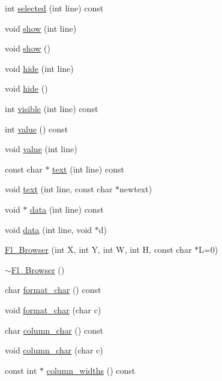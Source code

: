 \begin{DoxyCompactItemize}
int \hyperlink{class_fl___browser_aca66dd0e41251d25abefbcff1602194d}{selected} (int line) const
\item 
void \hyperlink{class_fl___browser_a747329b9fc4ebe4c634f80e211e1518c}{show} (int line)
\item 
void \hyperlink{class_fl___browser_a606986c7d588114a399990c0c1495324}{show} ()
\item 
void \hyperlink{class_fl___browser_aa9e3cf5f379f53b88b03ef8968cb5b2e}{hide} (int line)
\item 
void \hyperlink{class_fl___browser_a23c16146f17a31b4e952a717b6f6f12d}{hide} ()
\item 
int \hyperlink{class_fl___browser_a04052ea5a7c193a09df752b7fe4595df}{visible} (int line) const
\item 
int \hyperlink{class_fl___browser_ab5fb4b7c3981af6d05399fec54eb1aa9}{value} () const
\item 
void \hyperlink{class_fl___browser_aa13e62327433a6106aa1feb4a72ac8bf}{value} (int line)
\item 
const char $\ast$ \hyperlink{class_fl___browser_abf05e8bddaaceabd53bb6c61d13d9f00}{text} (int line) const
\item 
void \hyperlink{class_fl___browser_a3a87a0b133441259aeb28d35744c4728}{text} (int line, const char $\ast$newtext)
\item 
void $\ast$ \hyperlink{class_fl___browser_a493579eaccee746b45728aa55851b864}{data} (int line) const
\item 
void \hyperlink{class_fl___browser_a92cd0c769bb7a6943883dca34845b29a}{data} (int line, void $\ast$d)
\item 
\hyperlink{class_fl___browser_a5d3af1b476a55adac06f5c07ed897243}{Fl\+\_\+\+Browser} (int X, int Y, int W, int H, const char $\ast$L=0)
\item 
\hyperlink{class_fl___browser_abe85f8086c10a9f3d65109beedaa91ff}{$\sim$\+Fl\+\_\+\+Browser} ()
\item 
char \hyperlink{class_fl___browser_a129dca59d64baf166503ba59341add69}{format\+\_\+char} () const
\item 
void \hyperlink{class_fl___browser_a53128003f4f9d8e0ad76faa518efa246}{format\+\_\+char} (char c)
\item 
char \hyperlink{class_fl___browser_ab27dc1a532ccd1c370820229cc1b99f6}{column\+\_\+char} () const
\item 
void \hyperlink{class_fl___browser_a9343f3861915cb5a99ecaad113f82123}{column\+\_\+char} (char c)
\item 
const int $\ast$ \hyperlink{class_fl___browser_a4a473cbb2e5f5d54b63549704a3a0dd0}{column\+\_\+widths} () const

\end{DoxyCompactItemize}
